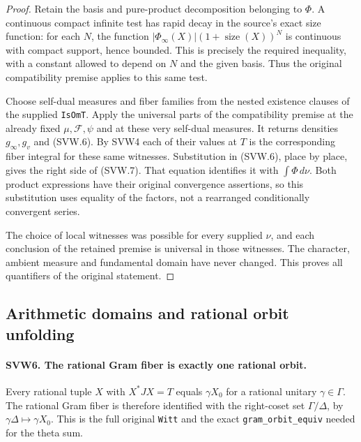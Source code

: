 \documentclass[11pt,a4paper]{article}
\numberwithin{equation}{section}
\theoremstyle{remark}\newtheorem{remark}[theorem]{Remark}
\begin{document}
\begin{proof}
Retain the basis and pure-product decomposition belonging to
$\Phi$.  A continuous compact infinite test has rapid decay in the
source's exact size function: for each $N$, the function
$|\Phi_\infty(X)|(1+\operatorname{size}(X))^N$ is continuous with
compact support, hence bounded.  This is precisely the required
inequality, with a constant allowed to depend on $N$ and the given
basis.  Thus the original compatibility premise applies to this
same test.

Choose self-dual measures and fiber families from the nested
existence clauses of the supplied \texttt{Is\allowbreak Om\allowbreak T}.  Apply the
universal parts of the compatibility premise at the already fixed
$\mu,\mathcal F,\psi$ and at these very self-dual measures.  It
returns densities $g_\infty,g_v$ and (SVW.6).  By SVW4 each of their
values at $T$ is the corresponding fiber integral for these same
witnesses.  Substitution in (SVW.6), place by place, gives the right
side of (SVW.7).  That equation identifies it with $\int\Phi\,d\nu$.
Both product expressions have their original convergence assertions,
so this substitution uses equality of the factors, not a rearranged
conditionally convergent series.

The choice of local witnesses was possible for every supplied
$\nu$, and each conclusion of the retained premise is universal
in those witnesses.  The character, ambient measure and fundamental
domain have never changed.  This proves all quantifiers of the
original statement.
\end{proof}

\subsection{Arithmetic domains and rational orbit unfolding}

\paragraph{SVW6. The rational Gram fiber is exactly one rational orbit.}
\label{claim:SVW6}
Every rational tuple $X$ with $X^*JX=T$ equals $\gamma X_0$ for a
rational unitary $\gamma\in\Gamma$.  The rational Gram fiber is
therefore identified with the right-coset set $\Gamma/\Delta$,
by $\gamma\Delta\mapsto\gamma X_0$.  This is the full original
\texttt{Witt} and the exact \texttt{gram\_\allowbreak orbit\_\allowbreak equiv} needed for
the theta sum.
\end{document}
